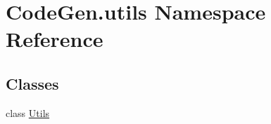 \hypertarget{namespaceCodeGen_1_1utils}{}\section{Code\+Gen.\+utils Namespace Reference}
\label{namespaceCodeGen_1_1utils}
\subsection*{Classes}
\begin{DoxyCompactItemize}
\item 
class \mbox{\hyperlink{classCodeGen_1_1utils_1_1Utils}{Utils}}
\end{DoxyCompactItemize}
